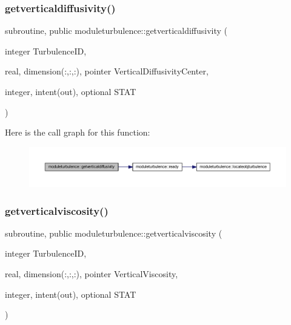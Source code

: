 \subsubsection{\texorpdfstring{getverticaldiffusivity()}{getverticaldiffusivity()}}
{\footnotesize\ttfamily subroutine, public moduleturbulence\+::getverticaldiffusivity (\begin{DoxyParamCaption}\item[{integer}]{Turbulence\+ID,  }\item[{real, dimension(\+:,\+:,\+:), pointer}]{Vertical\+Diffusivity\+Center,  }\item[{integer, intent(out), optional}]{S\+T\+AT }\end{DoxyParamCaption})}

Here is the call graph for this function\+:\nopagebreak
\begin{figure}[H]
\begin{center}
\leavevmode
\includegraphics[width=350pt]{namespacemoduleturbulence_a6067ede135e4137914b0f3958ddc0353_cgraph}
\end{center}
\end{figure}
\mbox{\label{namespacemoduleturbulence_a2ef11327f7c8ee6d8580c79c1a68bbdc}} 
\subsubsection{\texorpdfstring{getverticalviscosity()}{getverticalviscosity()}}
{\footnotesize\ttfamily subroutine, public moduleturbulence\+::getverticalviscosity (\begin{DoxyParamCaption}\item[{integer}]{Turbulence\+ID,  }\item[{real, dimension(\+:,\+:,\+:), pointer}]{Vertical\+Viscosity,  }\item[{integer, intent(out), optional}]{S\+T\+AT }\end{DoxyParamCaption})}

